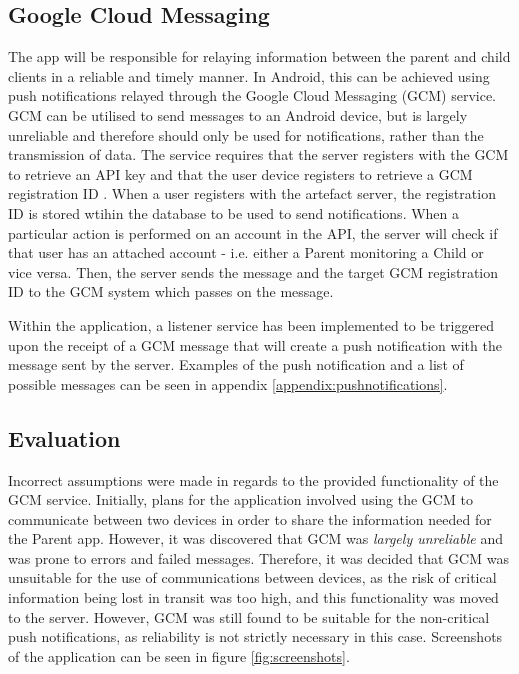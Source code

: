
\subsection{Google Cloud Messaging}
The app will be responsible for relaying information between the parent and child clients in a reliable and timely manner.
In Android, this can be achieved using push notifications relayed through the Google Cloud Messaging (GCM) service.
GCM can be utilised to send messages to an Android device, but is largely unreliable \citep{gcmreliability} and therefore should only be used for notifications, rather than the transmission of data.
The service requires that the server registers with the GCM to retrieve an API key and that the user device registers to retrieve a GCM registration ID \citep{gcm}. 
When a user registers with the artefact server, the registration ID is stored wtihin the database to be used to send notifications.
When a particular action is performed on an account in the API, the server will check if that user has an attached account - i.e. either a Parent monitoring a Child or vice versa.
Then, the server sends the message and the target GCM registration ID to the GCM system which passes on the message.

Within the application, a listener service has been implemented to be triggered upon the receipt of a GCM message that will create a push notification with the message sent by the server.
Examples of the push notification and a list of possible messages can be seen in appendix \ref{appendix:pushnotifications}.

\subsection{Evaluation}
Incorrect assumptions were made in regards to the provided functionality of the GCM service. 
Initially, plans for the application involved using the GCM to communicate between two devices in order to share the information needed for the Parent app.
However, it was discovered that GCM was \emph{largely unreliable} \citep{gcmreliability} and was prone to errors and failed messages.
Therefore, it was decided that GCM was unsuitable for the use of communications between devices, as the risk of critical information being lost in transit was too high, and this functionality was moved to the server.
However, GCM was still found to be suitable for the non-critical push notifications, as reliability is not strictly necessary in this case. 
Screenshots of the application can be seen in figure \ref{fig:screenshots}.

